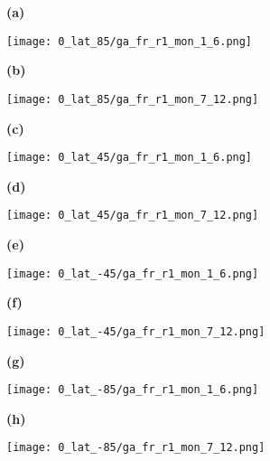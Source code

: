 \documentclass[preview]{standalone}
\begin{document}
\begin{figure}

  \begin{subfigure}[t]{0.05\textwidth}
    \textbf{\large{(a)}}
  \end{subfigure}
  \begin{subfigure}[t]{0.45\textwidth}
    \texttt{[image: 0\_lat\_85/ga\_fr\_r1\_mon\_1\_6.png]}
  \end{subfigure}
  \begin{subfigure}[t]{0.05\textwidth}
    \textbf{\large{(b)}}
  \end{subfigure}
  \begin{subfigure}[t]{0.45\textwidth}
    \texttt{[image: 0\_lat\_85/ga\_fr\_r1\_mon\_7\_12.png]}
  \end{subfigure}

  \begin{subfigure}[t]{0.05\textwidth}
    \textbf{\large{(c)}}
  \end{subfigure}
  \begin{subfigure}[t]{0.45\textwidth}
    \texttt{[image: 0\_lat\_45/ga\_fr\_r1\_mon\_1\_6.png]}
  \end{subfigure}
  \begin{subfigure}[t]{0.05\textwidth}
    \textbf{\large{(d)}}
  \end{subfigure}
  \begin{subfigure}[t]{0.45\textwidth}
    \texttt{[image: 0\_lat\_45/ga\_fr\_r1\_mon\_7\_12.png]}
  \end{subfigure}

  \begin{subfigure}[t]{0.05\textwidth}
    \textbf{\large{(e)}}
  \end{subfigure}
  \begin{subfigure}[t]{0.45\textwidth}
    \texttt{[image: 0\_lat\_-45/ga\_fr\_r1\_mon\_1\_6.png]}
  \end{subfigure}
  \begin{subfigure}[t]{0.05\textwidth}
    \textbf{\large{(f)}}
  \end{subfigure}
  \begin{subfigure}[t]{0.45\textwidth}
    \texttt{[image: 0\_lat\_-45/ga\_fr\_r1\_mon\_7\_12.png]}
  \end{subfigure}

  \begin{subfigure}[t]{0.05\textwidth}
    \textbf{\large{(g)}}
  \end{subfigure}
  \begin{subfigure}[t]{0.45\textwidth}
    \texttt{[image: 0\_lat\_-85/ga\_fr\_r1\_mon\_1\_6.png]}
  \end{subfigure}
  \begin{subfigure}[t]{0.05\textwidth}
    \textbf{\large{(h)}}
  \end{subfigure}
  \begin{subfigure}[t]{0.45\textwidth}
    \texttt{[image: 0\_lat\_-85/ga\_fr\_r1\_mon\_7\_12.png]}
  \end{subfigure}


\end{figure}
\end{document}
